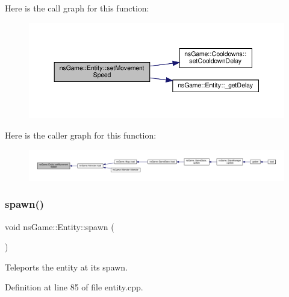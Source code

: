 Here is the call graph for this function\+:\nopagebreak
\begin{figure}[H]
\begin{center}
\leavevmode
\includegraphics[width=350pt]{structns_game_1_1_entity_a0254c30b6223caa723303266ad04e4cd_cgraph}
\end{center}
\end{figure}
Here is the caller graph for this function\+:\nopagebreak
\begin{figure}[H]
\begin{center}
\leavevmode
\includegraphics[width=350pt]{structns_game_1_1_entity_a0254c30b6223caa723303266ad04e4cd_icgraph}
\end{center}
\end{figure}
\mbox{\label{structns_game_1_1_entity_ac09f45ca50c9fef57a50c4414fc7e20d}} 
\subsubsection{\texorpdfstring{spawn()}{spawn()}}
{\footnotesize\ttfamily void ns\+Game\+::\+Entity\+::spawn (\begin{DoxyParamCaption}{ }\end{DoxyParamCaption})}



Teleports the entity at its spawn. 



Definition at line 85 of file entity.\+cpp.

\mbox{\label{structns_game_1_1_entity_af1da5da20798e01469c4a438d0b4174c}} 
